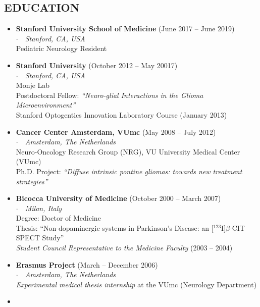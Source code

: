 \documentclass[line,margin]{res}
\newcommand{\superscript}[1]{\ensuremath{^{\textrm{#1}}}}
\newcommand{\titlestyle}[1]{{\bf #1}}
\newcommand{\placestyle}[1]{\footnotesize $\cdot$\ \ {\emph{#1}}}
\newcommand{\datestyle}[1]{{\tiny \dotfill} {\small (#1)}}
\begin{document}
\begin{resume}
\section{EDUCATION}
\begin{itemize}
\item {
  \titlestyle{Stanford University School of Medicine} \datestyle{June 2017 -- June 2019} \\
  { \placestyle{Stanford, CA, USA} } \\
  Pediatric Neurology Resident
}
\item {
  \titlestyle{Stanford University} \datestyle{October 2012 -- May 20017} \\
  { \placestyle{Stanford, CA, USA} } \\
  Monje Lab \\
  Postdoctoral Fellow: \emph{``Neuro-glial Interactions in the Glioma Microenvironment''} \\
  Stanford Optogentics Innovation Laboratory Course \datestyle{January 2013}
}
\item {
  \titlestyle{Cancer Center Amsterdam, VUmc} \datestyle{May 2008 -- July 2012} \\
  { \placestyle{Amsterdam, The Netherlands} } \\
  Neuro-Oncology Research Group (NRG), VU University Medical Center (VUmc) \\
  Ph.D. Project: \emph{``Diffuse intrinsic pontine gliomas: towards new treatment strategies''}
}
\item {
  \titlestyle{Bicocca University of Medicine} \datestyle{October 2000 -- March 2007} \\
  { \placestyle{Milan, Italy} } \\
  Degree: Doctor of Medicine \\
  Thesis: {\small ``Non-dopaminergic systems in Parkinson's Disease: an [\superscript{123}I]$\beta$-CIT SPECT Study''} \\
  \emph{Student Council Representative to the Medicine Faculty} \datestyle{2003 -- 2004}
}
\item {
  \titlestyle{Erasmus Project} \datestyle{March -- December 2006} \\
  { \placestyle{Amsterdam, The Netherlands} } \\
  \emph{Experimental medical thesis internship} at the VUmc (Neurology Department)
}
\item {
}
\end{itemize}
\end{resume}
\end{document}
